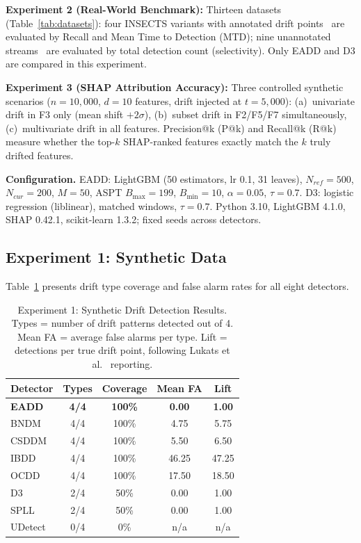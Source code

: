 \documentclass[conference,a4paper]{IEEEtran}
\begin{document}
\textbf{Experiment 2 (Real-World Benchmark):} Thirteen datasets (Table~\ref{tab:datasets}): four INSECTS variants with annotated drift points~\cite{b10} are evaluated by Recall and Mean Time to Detection (MTD); nine unannotated streams~\cite{b25} are evaluated by total detection count (selectivity). Only EADD and D3 are compared in this experiment.

\textbf{Experiment 3 (SHAP Attribution Accuracy):} Three controlled synthetic scenarios ($n{=}10{,}000$, $d{=}10$ features, drift injected at $t{=}5{,}000$): (a)~univariate drift in F3 only (mean shift $+2\sigma$), (b)~subset drift in F2/F5/F7 simultaneously, (c)~multivariate drift in all features. Precision@k (P@k) and Recall@k (R@k) measure whether the top-$k$ SHAP-ranked features exactly match the $k$ truly drifted features.

\textbf{Configuration.} EADD: LightGBM (50 estimators, lr 0.1, 31 leaves), $N_{ref}{=}500$, $N_{cur}{=}200$, $M{=}50$, ASPT $B_{\max}{=}199$, $B_{\min}{=}10$, $\alpha{=}0.05$, $\tau{=}0.7$. D3: logistic regression (liblinear), matched windows, $\tau{=}0.7$. Python 3.10, LightGBM 4.1.0, SHAP 0.42.1, scikit-learn 1.3.2; fixed seeds across detectors.

\subsection{Experiment 1: Synthetic Data}

Table~\ref{tab:exp1} presents drift type coverage and false alarm rates for all eight detectors.

\begin{table}[htbp]
    \caption{Experiment 1: Synthetic Drift Detection Results. Types = number of drift patterns detected out of 4. Mean FA = average false alarms per type. Lift = detections per true drift point, following Lukats et al.~\cite{b10} reporting.}
    \label{tab:exp1}
    \centering\footnotesize
    \setlength{\tabcolsep}{3pt}
    \begin{tabular*}{\columnwidth}{@{\extracolsep{\fill}}lcccc}
        \toprule
        \textbf{Detector} & \textbf{Types} & \textbf{Coverage} & \textbf{Mean FA} & \textbf{Lift} \\
        \midrule
        \textbf{EADD} & \textbf{4/4} & \textbf{100\%} & \textbf{0.00} & \textbf{1.00} \\
        BNDM & 4/4 & 100\% & 4.75 & 5.75 \\
        CSDDM & 4/4 & 100\% & 5.50 & 6.50 \\
        IBDD & 4/4 & 100\% & 46.25 & 47.25 \\
        OCDD & 4/4 & 100\% & 17.50 & 18.50 \\
        D3 & 2/4 & 50\% & 0.00 & 1.00 \\
        SPLL & 2/4 & 50\% & 0.00 & 1.00 \\
        UDetect & 0/4 & 0\% & n/a & n/a \\
        \bottomrule
    \end{tabular*}
\end{table}
\end{document}
